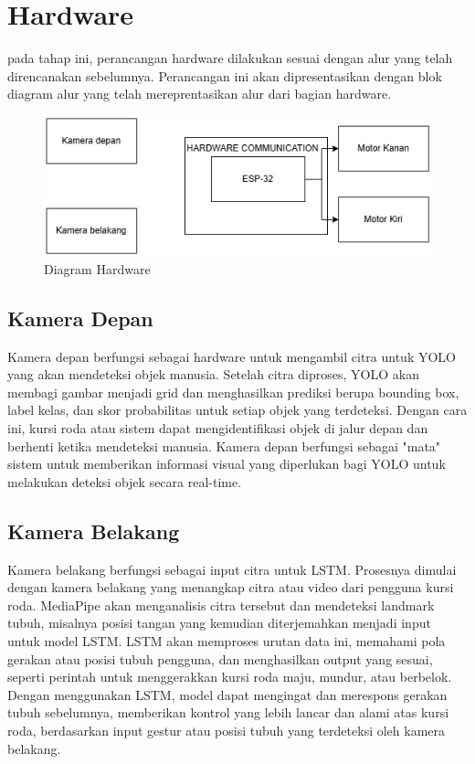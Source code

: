 \newpage
\section{Hardware}
pada tahap ini, perancangan hardware dilakukan sesuai dengan alur yang telah direncanakan sebelumnya. Perancangan ini akan dipresentasikan dengan blok diagram alur yang telah mereprentasikan alur dari bagian hardware.
\begin{figure} [H] \centering
  \includegraphics[scale=0.6]{gambar/hardware new.jpg}
  \caption{Diagram Hardware}
  \label{fig:hardware}
\end{figure}

\subsection{Kamera Depan}
Kamera depan berfungsi sebagai hardware untuk mengambil citra untuk YOLO yang akan mendeteksi objek manusia. Setelah citra diproses, YOLO akan membagi gambar menjadi grid dan menghasilkan prediksi berupa bounding box, label kelas, dan skor probabilitas untuk setiap objek yang terdeteksi. Dengan cara ini, kursi roda atau sistem dapat mengidentifikasi objek di jalur depan dan berhenti ketika mendeteksi manusia. Kamera depan berfungsi sebagai "mata" sistem untuk memberikan informasi visual yang diperlukan bagi YOLO untuk melakukan deteksi objek secara real-time.

\subsection{Kamera Belakang}
Kamera belakang berfungsi sebagai input citra untuk LSTM. Prosesnya dimulai dengan kamera belakang yang menangkap citra atau video dari pengguna kursi roda. MediaPipe akan menganalisis citra tersebut dan mendeteksi landmark tubuh, misalnya posisi tangan yang kemudian diterjemahkan menjadi input untuk model LSTM. LSTM akan memproses urutan data ini, memahami pola gerakan atau posisi tubuh pengguna, dan menghasilkan output yang sesuai, seperti perintah untuk menggerakkan kursi roda maju, mundur, atau berbelok. Dengan menggunakan LSTM, model dapat mengingat dan merespons gerakan tubuh sebelumnya, memberikan kontrol yang lebih lancar dan alami atas kursi roda, berdasarkan input gestur atau posisi tubuh yang terdeteksi oleh kamera belakang.
